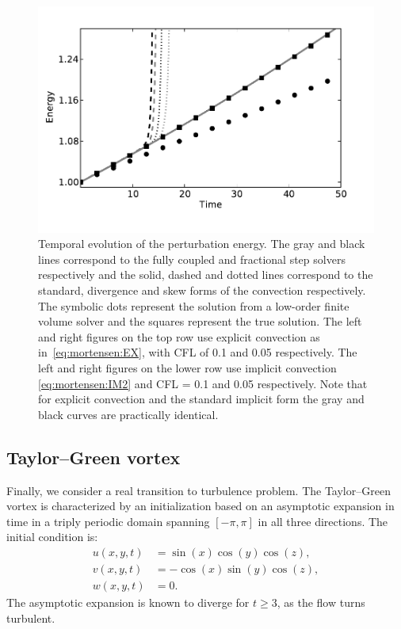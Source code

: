 \begin{figure}
  \includegraphics[width=\twofigs]{chapters/mortensen/pdf/OS_energy_cfl_0_05_model_0.pdf}
  \caption{Temporal evolution of the perturbation energy. The gray and
    black lines correspond to the fully coupled and fractional step
    solvers respectively and the solid, dashed and dotted lines
    correspond to the standard, divergence and skew forms of the
    convection respectively. The symbolic dots represent the solution
    from a low-order finite volume solver and the squares represent the
    true solution. The left and right figures on the top row use explicit convection
    as in~\eqref{eq:mortensen:EX}, with CFL of 0.1 and 0.05 respectively.
    The left and right figures on the lower row use implicit convection \eqref{eq:mortensen:IM2} and CFL =
    0.1 and 0.05 respectively. Note that for explicit convection and the standard
    implicit form the gray and black curves are practically
    identical. }
\label{fig:mortensen:OS_long_time}
\end{figure}


\subsection{Taylor--Green vortex}
\label{sec:mortensen:TG}

Finally, we consider a real transition to turbulence problem. The
Taylor--Green vortex is characterized by an initialization based on
an asymptotic expansion in time in a triply periodic domain spanning
$[-\pi,\pi]$ in all three directions. The initial condition is:
\begin{align}
 u(x,y,t)&=\sin(x)\cos(y)\cos(z),
\\
 v(x,y,t)&=-\cos(x)\sin(y)\cos(z),
\\
 w(x,y,t)&=0.
\end{align}
The asymptotic expansion is known to diverge for $t \ge 3$, as the flow
turns turbulent.

